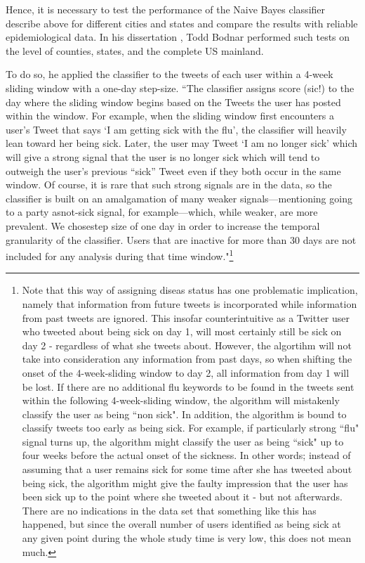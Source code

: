 \documentclass[11pt, a4paper]{report}\usepackage[]{graphicx}\usepackage[]{color}
\begin{document}
Hence, it is necessary to test the performance of the Naive Bayes classifier describe above for different cities and states and compare the results with reliable epidemiological data. In his dissertation \citep{bodnar_data_2015}, Todd Bodnar performed such tests on the level of counties, states, and the complete US mainland.\newline

To do so, he applied the classifier to the tweets of each user within a 4-week sliding window with a one-day step-size. ``The classifier assigns score (sic!) to the day where the sliding window begins based on the Tweets the user has posted within the window. For example, when the sliding window first encounters a user’s Tweet that says `I am getting sick with the flu', the classifier will heavily lean toward her being sick. Later, the user may Tweet `I am no longer sick' which will give a strong signal that the user is no longer sick which will tend to outweigh the user’s previous “sick” Tweet even if they both occur in the same window. Of course, it is rare that such strong signals are in the data, so the classifier is built on an amalgamation of many weaker signals—mentioning going to a party asnot-sick signal, for example—which, while weaker, are more prevalent. We chosestep size of one day in order to increase the temporal granularity of the classifier. Users that are inactive for more than 30 days are not included for any analysis during that time window."\footnote{Note that this way of assigning diseas status has one problematic implication, namely that information from future tweets is incorporated while information from past tweets are ignored. This insofar counterintuitive as a Twitter user who tweeted about being sick on day 1, will most certainly still be sick on day 2 - regardless of what she tweets about. However, the algortihm will not take into consideration any information from past days, so when shifting the onset of the 4-week-sliding window to day 2, all information from day 1 will be lost. If there are no additional flu keywords to be found in the tweets sent within the following 4-week-sliding window, the algorithm will mistakenly classify the user as being ``non sick". 
In addition, the algorithm is bound to classify tweets too early as being sick. For example, if particularly strong ``flu" signal turns up, the algorithm might classify the user as being ``sick" up to four weeks before the actual onset of the sickness. In other words; instead of assuming that a user remains sick for some time after she has tweeted about being sick, the algorithm might give the faulty impression that the user has been sick up to the point where she tweeted about it - but not afterwards.
There are no indications in the data set that something like this has happened, but since the overall number of users identified as being sick at any given point during the whole study time is very low, this does not mean much.}\newline
\end{document}
